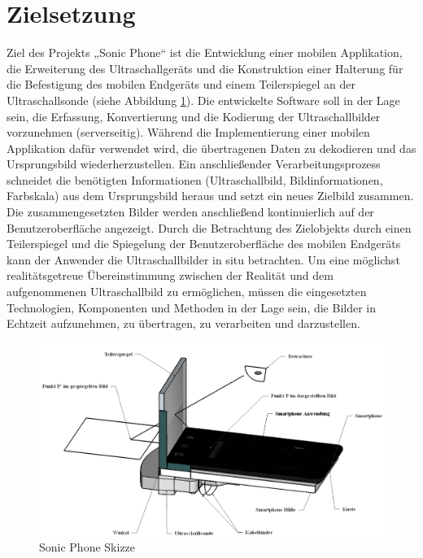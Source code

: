 \section{Zielsetzung}
Ziel des Projekts „Sonic Phone“ ist die Entwicklung einer mobilen Applikation, die Erweiterung des Ultraschallgeräts und die Konstruktion einer Halterung für die Befestigung des mobilen Endgeräts und einem Teilerspiegel an der Ultraschallsonde (siehe Abbildung \ref{fig:sonic_phone_skizze}). Die entwickelte Software soll in der Lage sein, die Erfassung, Konvertierung und die Kodierung der Ultraschallbilder vorzunehmen (serverseitig). Während die Implementierung einer mobilen Applikation dafür verwendet wird, die übertragenen Daten zu dekodieren und das Ursprungsbild wiederherzustellen. Ein anschließender Verarbeitungsprozess schneidet die benötigten Informationen (Ultraschallbild, Bildinformationen, Farbskala) aus dem Ursprungsbild heraus und setzt ein neues Zielbild zusammen. Die zusammengesetzten Bilder werden anschließend kontinuierlich auf der Benutzeroberfläche angezeigt. Durch die Betrachtung des Zielobjekts durch einen Teilerspiegel und die Spiegelung der Benutzeroberfläche des mobilen Endgeräts kann der Anwender die Ultraschallbilder in situ betrachten. Um eine möglichst realitätsgetreue Übereinstimmung zwischen der Realität und dem aufgenommenen Ultraschallbild zu ermöglichen, müssen die eingesetzten Technologien, Komponenten und Methoden in der Lage sein, die Bilder in Echtzeit aufzunehmen, zu übertragen, zu verarbeiten und darzustellen.

\begin{figure}[h]
	\centering
	\includegraphics[width=1\textwidth]{Bilder/Einleitung/SonicPhoneSkizzeQuer.PNG}
	\caption{Sonic Phone Skizze}
	\label{fig:sonic_phone_skizze}
\end{figure}
